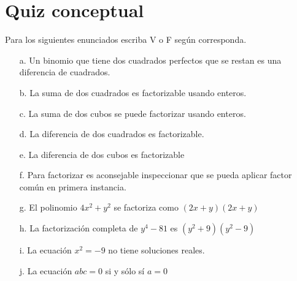 \documentclass[10pt,twoside]{article}
\begin{document}
\section*{Quiz conceptual}
Para los siguientes enunciados escriba V o F según corresponda.
\begin{enumerate}
\item[a.] Un binomio que tiene dos cuadrados perfectos que se restan es una diferencia de cuadrados.
\item[b.] La suma de dos cuadrados es factorizable usando enteros.
\item[c.] La suma de dos cubos se puede factorizar usando enteros.
\item[d.] La diferencia de dos cuadrados es factorizable.
\item[e.] La diferencia de dos cubos es factorizable
\item[f.] Para factorizar es aconsejable inspeccionar que se pueda aplicar factor común en primera instancia.
\item[g.] El polinomio $4x^{2}+y^{2}$ se factoriza como $(2x+y)(2x+y)$
\item[h.] La factorización completa de $y^{4}-81$ es $(y^{2}+9)(y^{2}-9)$
\item[i.] La ecuación $x^{2}=-9$ no tiene soluciones reales.
\item[j.] La ecuación $abc=0$ si y sólo sí $a=0$ 
\end{enumerate}
\end{document}
